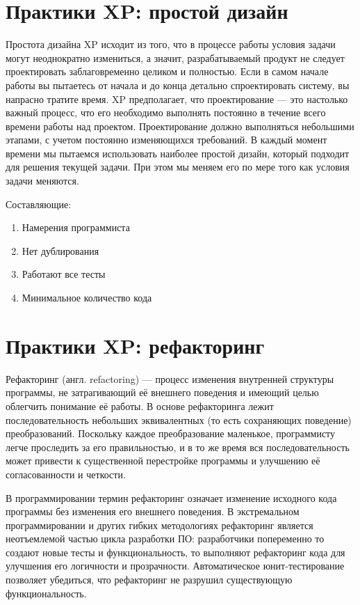 \documentclass{article}
\begin{document}
\section{Практики XP: простой дизайн}
    Простота дизайна XP исходит из того, что в процессе работы условия задачи могут неоднократно измениться, а значит, разрабатываемый продукт не следует проектировать заблаговременно целиком и полностью. Если в самом начале работы вы пытаетесь от начала и до конца детально спроектировать систему, вы напрасно тратите время. XP предполагает, что проектирование — это настолько важный процесс, что его необходимо выполнять постоянно в течение всего времени работы над проектом. Проектирование должно выполняться небольшими этапами, с учетом постоянно изменяющихся требований. В каждый момент времени мы пытаемся использовать наиболее простой дизайн, который подходит для решения текущей задачи. При этом мы меняем его по мере того как условия задачи меняются.

    Составляющие:
    \begin{enumerate}
        \item Намерения программиста
        \item Нет дублирования
        \item Работают все тесты
        \item Минимальное количество кода
    \end{enumerate}

\section{Практики XP: рефакторинг}
    Рефакторинг (англ. refactoring) — процесс изменения внутренней структуры программы, не затрагивающий её внешнего поведения и имеющий целью облегчить понимание её работы. В основе рефакторинга лежит последовательность небольших эквивалентных (то есть сохраняющих поведение) преобразований. Поскольку каждое преобразование маленькое, программисту легче проследить за его правильностью, и в то же время вся последовательность может привести к существенной перестройке программы и улучшению её согласованности и четкости.

    В программировании термин рефакторинг означает изменение исходного кода программы без изменения его внешнего поведения. В экстремальном программировании и других гибких методологиях рефакторинг является неотъемлемой частью цикла разработки ПО: разработчики попеременно то создают новые тесты и функциональность, то выполняют рефакторинг кода для улучшения его логичности и прозрачности. Автоматическое юнит-тестирование позволяет убедиться, что рефакторинг не разрушил существующую функциональность.
\end{document}
